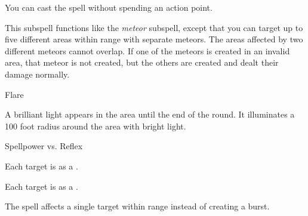 You can cast the spell without spending an action point.






This subspell functions like the \textit{meteor} subspell, except that you can target up to five different areas within range with separate meteors.
The areas affected by two different meteors cannot overlap.
If one of the meteors is created in an invalid area, that meteor is not created, but the others are created and dealt their damage normally.





\newpage
\begin{spellsection}{Flare}

\begin{spellcontent}

\begin{spelltargetinginfo}




\end{spelltargetinginfo}


\begin{spelleffects}



\spelleffect
A brilliant light appears in the area until the end of the round.
It illuminates a 100 foot radius around the area with bright light.




\begin{spellattack}{Spellpower vs. Reflex}


\hit
Each target is \dazzled as a .



\crit
Each target is \blinded as a .



\end{spellattack}





\end{spelleffects}

\end{spellcontent}
\begin{spellfooter}


\end{spellfooter}
\begin{spellsubcontent}


\begin{spellcantrip}
The spell affects a single target within range instead of creating a burst.
\end{spellcantrip}


\end{spellsubcontent}
\end{spellsection}


